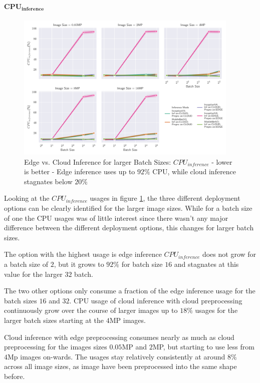 \paragraph{$\mathbf{CPU_{inference}}$}
\begin{figure}[!htb]
\centering
\includegraphics[width=0.95\textwidth]{./Bilder/single_plots/batch_size_plots/Effects_of_Batch_size_Inference_CPU_Usage.pdf}
\caption[Edge vs. Cloud Inference for larger Batch Sizes:  $CPU_{inference}$ - lower is better]{Edge vs. Cloud Inference for larger Batch Sizes:  $CPU_{inference}$ - lower is better - Edge inference uses up to $92\%$ CPU, while cloud inference stagnates below $20\%$}
\label{fig:BatchSizeInferenceCPU}
\end{figure}

Looking at the $CPU_{inference}$ usages in figure \ref{fig:BatchSizeInferenceCPU}, the three different deployment options can be clearly identified for the larger image sizes.
While for a batch size of one the CPU usages was of little interest since there wasn't any major difference between the different deployment options, this changes for larger batch sizes.

The option with the highest usage is edge inference $CPU_{inference}$ does not grow for a batch size of $2$, but it grows to $92\%$ for batch size $16$ and stagnates at this value for the larger $32$ batch.

The two other options only consume a fraction of the edge inference usage for the batch sizes $16$ and $32$.
CPU usage of cloud inference with cloud preprocessing continuously grow over the course of larger images up to $18\%$ usages for the larger batch sizes starting at the $4$MP images.

Cloud inference with edge preprocessing consumes nearly as much as cloud preprocessing for the images sizes $0.05$MP and $2$MP, but starting to use less from $4$Mp images on-wards.
The usages stay relatively consistently at around $8\%$ across all image sizes, as image have been preprocessed into the same shape before.

